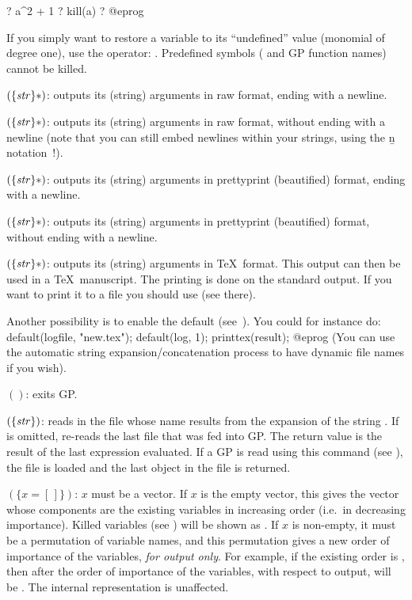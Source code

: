 \bprog
? a^2 + 1
? kill(a)
? %
@eprog

If you simply want to restore a variable to its ``undefined'' value
(monomial of degree one), use the  operator: .
Predefined symbols ( and GP function names) cannot be killed.

$(\{\hbox{\it str\/}\}*)$: outputs its (string) arguments in raw
format, ending with a newline.

$(\{\hbox{\it str\/}\}*)$: outputs its (string) arguments in raw
format, without ending with a newline (note that you can still embed newlines
within your strings, using the \b{n} notation~!).

$(\{\hbox{\it str\/}\}*)$: outputs its (string) arguments in
prettyprint (beautified) format, ending with a newline.

$(\{\hbox{\it str\/}\}*)$: outputs its (string) arguments in
prettyprint (beautified) format, without ending with a newline.

$(\{\hbox{\it str\/}\}*)$: outputs its (string) arguments in
\TeX\ format. This output can then be used in a \TeX\ manuscript.
The printing is done on the standard output. If you want to print it to a
file you should use  (see there).

Another possibility is to enable the  default
(see~).
You could for instance do:
%
\bprog
default(logfile, "new.tex");
default(log, 1);
printtex(result);
@eprog
\noindent
(You can use the automatic string expansion/concatenation process to have
dynamic file names if you wish).

$()$: exits GP.\label{se:quit}

$(\{\hbox{\it str\/}\})$: reads in the file whose name results
from the expansion of the string . If  is omitted,
re-reads the last file that was fed into GP. The return value is the result of
the last expression evaluated.\label{se:read} If a GP  is
read using this command (see ), the file is loaded and
the last object in the file is returned.

$(\{x=[\,]\})$: $x$ must be a vector. If $x$ is the
empty vector, this gives the vector whose components are the existing
variables in increasing order (i.e.~in decreasing importance). Killed
variables (see ) will be shown as . If $x$ is
non-empty, it must be a permutation of variable names, and this permutation
gives a new order of importance of the variables, \emph{for output only}. For
example, if the existing order is \kbd{[x,y,z]}, then after
 the order of importance of the variables, with respect
to output, will be \kbd{[z,y,x]}. The internal representation is unaffected.
\label{se:reorder}

